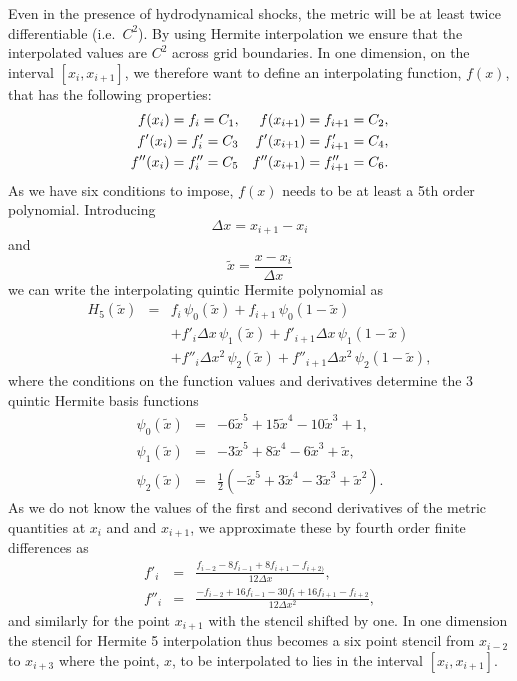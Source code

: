 \documentclass[useAMS,usenatbib]{iopart}
\begin{document}
Even in the presence of hydrodynamical shocks, the metric will be at least
twice differentiable (i.e.\ $C^2$). By using Hermite interpolation we ensure
that the interpolated values are $C^2$ across grid boundaries. In one dimension,
on the interval $[x_i,x_{i+1}]$, we therefore want to define an interpolating
function, $f(x)$, that has the following properties:
\begin{eqnarray}
f(x_i) = f_i = C_1, & \mbox{\vspace{2em}} & f(x_{i+1}) = f_{i+1} = C_2, \nonumber \\
f'(x_i) = f'_i = C_3  & \mbox{\vspace{2em}} & f'(x_{i+1}) = f'_{i+1} = C_4, \\
f''(x_i) = f''_i = C_5  & \mbox{\vspace{2em}} & f''(x_{i+1}) = f''_{i+1} = C_6. \nonumber
\end{eqnarray}
As we have six conditions to impose, $f(x)$ needs to be at least a 5th order
polynomial. Introducing
\begin{equation}
\Delta x = x_{i+1}-x_i
\end{equation}
and
\begin{equation}
\tilde{x} = \frac{x-x_i}{\Delta x}
\end{equation}
we can write the interpolating quintic Hermite polynomial as
\begin{eqnarray}
H_5(\tilde{x}) & = & f_i\,\psi_0(\tilde{x})+f_{i+1}\,\psi_0(1-\tilde{x}) \nonumber \\
       & & +f'_i\Delta x\,\psi_1(\tilde{x})+f'_{i+1}\Delta x\,\psi_1(1-\tilde{x}) \\
       & & +f''_i\Delta x^2\,\psi_2(\tilde{x})+f''_{i+1}\Delta x^2\,\psi_2(1-\tilde{x}),
             \nonumber 
\end{eqnarray}
where the conditions on the function values and derivatives determine the
3 quintic Hermite basis functions
\begin{eqnarray}
\psi_0(\tilde{x}) & = & -6 \tilde{x}^5 +15 \tilde{x}^4 - 10 \tilde{x}^3 + 1, \nonumber \\
\psi_1(\tilde{x}) & = & -3 \tilde{x}^5 +8 \tilde{x}^4 - 6 \tilde{x}^3 + \tilde{x}, \\
\psi_2(\tilde{x}) & = & \frac{1}{2} ( -\tilde{x}^5 +3 \tilde{x}^4 - 3 \tilde{x}^3 + \tilde{x}^2 ). \nonumber
\end{eqnarray}
As we do not know the values of the first and second derivatives of the metric
quantities at $x_i$ and and $x_{i+1}$, we approximate these by fourth order
finite differences as
\begin{eqnarray}
f'_i & = & \frac{f_{i-2}-8 f_{i-1}+8 f_{i+1}-f_{i+2)}}
                   {12 \Delta x}, \\
f''_i & = & \frac{-f_{i-2}+16 f_{i-1}-30 f_i+16 f_{i+1}-f_{i+2}}
                    {12 \Delta x^2},
\end{eqnarray}
and similarly for the point $x_{i+1}$ with the stencil shifted by one.
In one dimension the stencil for Hermite 5 interpolation thus becomes a
six point stencil from $x_{i-2}$ to $x_{i+3}$ where the point, $x$, to be
interpolated to lies in the interval $[x_i, x_{i+1}]$.
\end{document}
